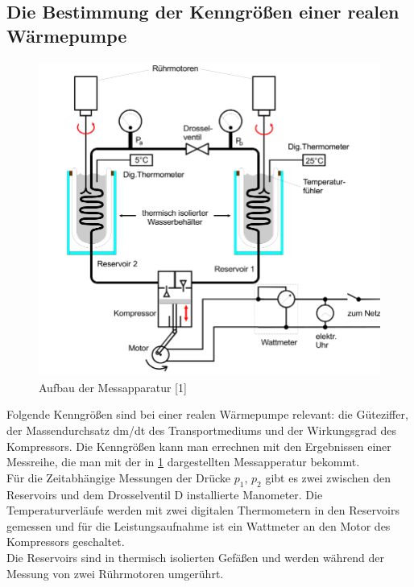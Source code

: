 \subsection{Die Bestimmung der Kenngrößen einer realen Wärmepumpe}
\begin{figure}
    \centering
    \includegraphics[scale=0.5]{aufbau2.pdf}
    \caption{Aufbau der Messapparatur [1]}
    \label{fig:aufbau2}
\end{figure}
Folgende Kenngrößen sind bei einer realen Wärmepumpe relevant: die Güteziffer, der Massendurchsatz dm/dt des Transportmediums und der Wirkungsgrad des Kompressors. Die Kenngrößen kann man errechnen mit den 
Ergebnissen einer Messreihe, die man mit der in \ref{fig:aufbau2} dargestellten Messapperatur bekommt.\\
Für die Zeitabhängige Messungen der Drücke $p_1$, $p_2$ gibt es zwei zwischen den Reservoirs und dem Drosselventil D installierte Manometer. Die 
Temperaturverläufe werden mit zwei digitalen Thermometern in den Reservoirs gemessen und für die Leistungsaufnahme ist ein Wattmeter an den Motor des Kompressors geschaltet.\\
Die Reservoirs sind in thermisch isolierten Gefäßen und werden während der Messung von zwei Rührmotoren umgerührt.\\
